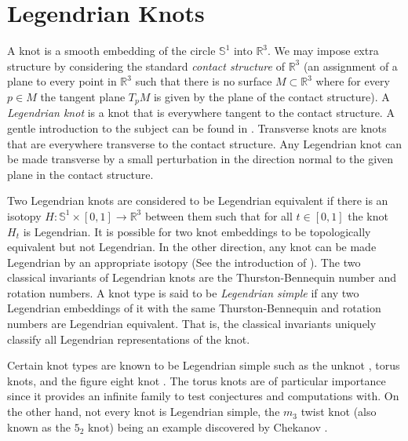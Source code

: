 \documentclass{article}
\theoremstyle{plain}
\begin{document}
	\section{Legendrian Knots}
	    A knot is a smooth embedding of the circle $\mathbb{S}^{1}$ into
	    $\mathbb{R}^{3}$. We may impose extra structure by considering the
	    standard \textit{contact structure} of $\mathbb{R}^{3}$ (an assignment
	    of a plane to every point in $\mathbb{R}^{3}$ such that there is no
	    surface $M\subset\mathbb{R}^{3}$ where for every $p\in{M}$ the tangent
	    plane $T_{p}M$ is given by the plane of the contact structure). A
	    \textit{Legendrian knot} is a knot that is everywhere tangent to the
	    contact structure. A gentle introduction to the subject can be found in
	    \cite{JoshuaMSabloffWhatIsLegendrianKnot}. Transverse knots are knots
	    that are everywhere transverse to the contact structure. Any Legendrian
	    knot can be made transverse by a small perturbation in the direction
	    normal to the given plane in the contact structure.
	    \par\hfill\par
	    Two Legendrian knots are considered to be Legendrian equivalent if
	    there is an isotopy
	    $H:\mathbb{S}^{1}\times[0,1]\rightarrow\mathbb{R}^{3}$ between them
	    such that for all $t\in[0,1]$ the knot $H_{t}$ is Legendrian. It is
	    possible for two knot embeddings to be topologically equivalent but not
	    Legendrian. In the other direction, any knot can be made Legendrian by
	    an appropriate isotopy (See the introduction of
	    \cite{VeraVertessiTransNonSimpleKnots}). The two classical invariants
	    of Legendrian knots are the Thurston-Bennequin number and rotation
	    numbers. A knot type is said to be \textit{Legendrian simple} if
	    any two Legendrian embeddings of it with the same Thurston-Bennequin
	    and rotation numbers are Legendrian equivalent. That is, the classical
	    invariants uniquely classify all Legendrian representations of the
	    knot.
	    \par\hfill\par
	    Certain knot types are known to be Legendrian simple such as the unknot
	    \cite{EliashbergFraserClassificationTopTrivialLegKnots}, torus knots,
	    and the figure eight knot \cite{EtnyreHondaContactTopologyI}. The torus
	    knots are of particular importance since it provides an infinite
	    family to test conjectures and computations with. On the other hand,
	    not every knot is Legendrian simple, the $m_{3}$ twist knot (also
	    known as the $5_{2}$ knot) being an example discovered by Chekanov
	    \cite{ChekanovDifAlgOfLegLinks}.
\end{document}
